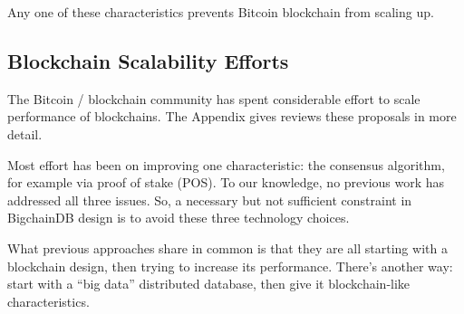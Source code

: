 Any one of these characteristics prevents Bitcoin blockchain from scaling up.

\subsection{Blockchain Scalability Efforts}
The Bitcoin / blockchain community has spent considerable effort to scale performance of blockchains.
The Appendix gives reviews these proposals in more detail.

Most effort has been on improving one characteristic: the consensus algorithm, for example via proof of stake (POS).
To our knowledge, no previous work has addressed all three issues.
So, a necessary but not sufficient constraint in BigchainDB design is to avoid these three technology choices.

What previous approaches share in common is that they are all starting with a blockchain design, then trying to increase its performance.
There’s another way: start with a “big data” distributed database, then give it blockchain-like characteristics.